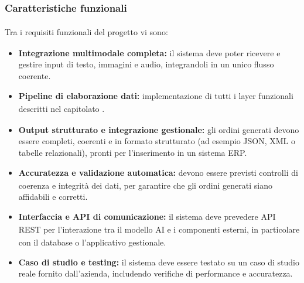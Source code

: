 \documentclass[a4paper,11pt]{article}
\begin{document}
\subsubsection{Caratteristiche funzionali\textsubscript{}
}
Tra i requisiti\textsubscript{}
 funzionali\textsubscript{}
 del progetto\textsubscript{}
 vi sono:
\begin{itemize}
 \item \textbf{Integrazione multimodale completa:} il sistema deve poter ricevere e gestire input di testo, immagini e audio, integrandoli in un unico flusso coerente.
 \item \textbf{Pipeline di elaborazione dati:} implementazione\textsubscript{} di tutti i layer funzionali descritti nel capitolato\textsubscript{}
.
 \item \textbf{Output strutturato e integrazione gestionale:} gli ordini generati devono essere completi, coerenti e in formato strutturato (ad esempio JSON, XML o tabelle relazionali), pronti per l'inserimento in un sistema ERP.
 \item \textbf{Accuratezza e validazione\textsubscript{}
 automatica:} devono essere previsti controlli di coerenza e integrità dei dati, per garantire che gli ordini generati siano affidabili e corretti.
 \item \textbf{Interfaccia\textsubscript{} e API\textsubscript{}
 di comunicazione:} il sistema deve prevedere API\textsubscript{}
 REST per l'interazione tra il modello AI\textsubscript{}
 e i componenti esterni, in particolare con il database o l'applicativo gestionale.
 \item \textbf{Caso di studio e testing:} il sistema deve essere testato su un caso di studio reale fornito dall'azienda, includendo verifiche di performance e accuratezza.
\end{itemize}
\end{document}
